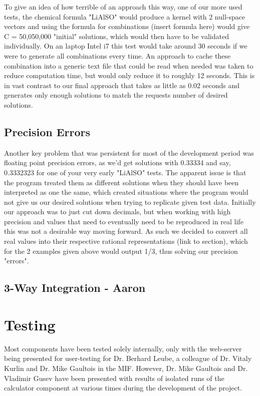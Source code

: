 To give an idea of how terrible of an approach this way, one of our more used tests, the chemical formula "LiAlSO" would produce a kernel with 2 null-space vectors and using the formula for combinations (insert formula here) would give C = 50,050,000 "initial" solutions, which would then have to be validated individually. On an laptop Intel i7 this test would take around 30 seconds if we were to generate all combinations every time. An approach to cache these combination into a generic text file that could be read when needed was taken to reduce computation time, but would only reduce it to roughly 12 seconds. This is in vast contrast to our final approach that takes as little as 0.02 seconds and generates only enough solutions to match the requests number of desired solutions. \\

\subsection*{Precision Errors}
Another key problem that was persistent for most of the development period was floating point precision errors, as we'd get solutions with 0.33334 and say, 0.3332323 for one of your very early "LiAlSO" tests. The apparent issue is that the program treated them as different solutions when they should have been interpreted as one the same, which created situations where the program would not give us our desired solutions when trying to replicate given test data. Initially our approach was to just cut down decimals, but when working with high precision and values that need to eventually need to be reproduced in real life this was not a desirable way moving forward. As such we decided to convert all real values into their respective rational representations (link to section), which for the 2 examples given above would output 1/3, thus solving our precision "errors".

\subsection*{3-Way Integration - Aaron}


\section{Testing}
Most components have been tested solely internally, only with the web-server being presented for user-testing for Dr. Berhard Leube, a colleague of Dr. Vitaly Kurlin and Dr. Mike Gaultois in the MIF. However, Dr. Mike Gaultois and Dr. Vladimir Gusev have been presented with results of isolated runs of the calculator component at various times during the development of the project. \\

